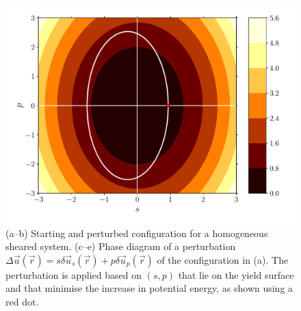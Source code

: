 \documentclass[fleqn]{goose-article}
\begin{document}
\begin{figure}[htp]
\begin{minipage}[t]{.31\textwidth}
        \includegraphics[width=\textwidth]{example_shear_phase-diagram_energy-contour.pdf}
    \end{minipage}
    \caption{
        (a--b) Starting and perturbed configuration for a homogeneous sheared system.
        (c--e) Phase diagram of a perturbation
        $\Delta \vec{u}(\vec{r}) = s \delta \vec{u}_s (\vec{r}) + p \delta \vec{u}_p (\vec{r})$
        of the configuration in (a).
        The perturbation is applied based on $(s, p)$ that lie on the yield surface and
        that minimise the increase in potential
        energy, as shown using a red dot.
    }
    \label{fig:example:shear}
\end{figure}
\end{document}
